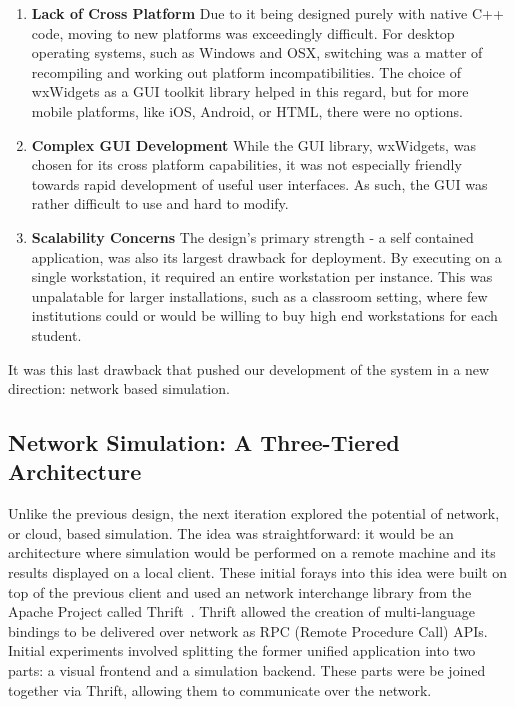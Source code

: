  \begin{enumerate}

   \item \textbf{Lack of Cross Platform} Due to it being designed
     purely with native C++ code, moving to new platforms was
     exceedingly difficult. For desktop operating systems, such as
     Windows and OSX, switching was a matter of recompiling and
     working out platform incompatibilities. The choice of wxWidgets as
     a GUI toolkit library helped in this regard, but for more mobile
     platforms, like iOS, Android, or HTML, there were no options.   
   
   \item \textbf{Complex GUI Development} While the GUI library,
     wxWidgets, was chosen for its cross platform capabilities, it was
     not especially friendly towards rapid development of useful user
     interfaces. As such, the GUI was rather difficult to use and hard
     to modify.

   \item \textbf{Scalability Concerns} The design's primary strength -
     a self contained application, was also its largest drawback for
     deployment. By executing on a single workstation, it required an
     entire workstation per instance. This was unpalatable for larger
     installations, such as a classroom setting, where few institutions
     could or would be willing to buy high end workstations for each student.
   
 \end{enumerate}

 
 It was this last drawback that pushed our development of the system
 in a new direction: network based simulation.

 \subsection{Network Simulation: A Three-Tiered Architecture}
 
 Unlike the previous design, the next iteration explored the potential
 of network, or cloud, based simulation. The idea was straightforward:
 it would be an architecture where simulation would be performed on a
 remote machine and its results displayed on a local client. These
 initial forays into this idea were built on top of the previous client and
 used an network interchange library from the Apache Project called
 Thrift~\citep{ASF:2008--2014}. Thrift allowed the creation of multi-language bindings to be
 delivered over network as RPC (Remote Procedure Call) APIs. Initial
 experiments involved splitting the former unified application into
 two parts: a visual frontend and a simulation backend. These parts
 were be joined together via Thrift, allowing them to communicate over
 the network.

